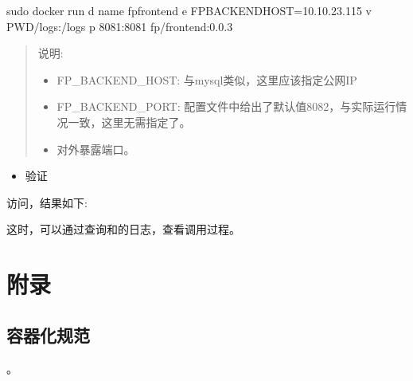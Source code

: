 \documentclass[letterpaper,10pt,english]{sphinxmanual}
\begin{document}
\begin{sphinxVerbatim}[commandchars=\\\{\}]
sudo docker run \PYGZhy{}d \PYGZhy{}\PYGZhy{}name fp\PYGZhy{}frontend \PYGZhy{}e FP\PYGZus{}BACKEND\PYGZus{}HOST=10.10.23.115 \PYGZhy{}v \PYGZdl{}PWD/logs:/logs \PYGZhy{}p 8081:8081 fp/frontend:0.0.3
\end{sphinxVerbatim}
\begin{quote}

说明:
\begin{itemize}
\item {} 
FP\_BACKEND\_HOST: 与mysql类似，这里应该指定公网IP

\item {} 
FP\_BACKEND\_PORT: 配置文件中给出了默认值8082，与实际运行情况一致，这里无需指定了。

\item {} 
对外暴露端口。

\end{itemize}
\end{quote}
\begin{itemize}
\item {} 
验证

\end{itemize}

访问，结果如下:

\begin{sphinxVerbatim}[commandchars=\\\{\}]
\end{sphinxVerbatim}

这时，可以通过查询和的日志，查看调用过程。


\chapter{附录}
\label{\detokenize{docker/appendix:id1}}\label{\detokenize{docker/appendix::doc}}

\section{容器化规范}
\label{\detokenize{docker/appendix:id2}}
。
\end{document}
